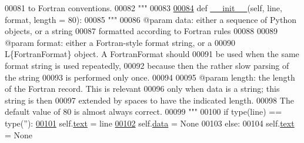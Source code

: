 \begin{DoxyCode}
00081 \textcolor{stringliteral}{         to Fortran conventions.}
00082 \textcolor{stringliteral}{    """}
00083 
\hypertarget{_fortran_format_8py_source_l00084}{}\hyperlink{classpyneb_1_1utils_1_1_fortran_format_1_1_fortran_line_a292ba8e3d93bd751d6d13fdc1671ccb2}{00084}     \textcolor{keyword}{def }\hyperlink{classpyneb_1_1utils_1_1_fortran_format_1_1_fortran_line_a292ba8e3d93bd751d6d13fdc1671ccb2}{\_\_init\_\_}(self, line, format, length = 80):
00085         \textcolor{stringliteral}{"""}
00086 \textcolor{stringliteral}{        @param data: either a sequence of Python objects, or a string}
00087 \textcolor{stringliteral}{                     formatted according to Fortran rules}
00088 \textcolor{stringliteral}{}
00089 \textcolor{stringliteral}{        @param format: either a Fortran-style format string, or a}
00090 \textcolor{stringliteral}{                       L\{FortranFormat\} object. A FortranFormat should}
00091 \textcolor{stringliteral}{                       be used when the same format string is used repeatedly,}
00092 \textcolor{stringliteral}{                       because then the rather slow parsing of the string}
00093 \textcolor{stringliteral}{                       is performed only once.}
00094 \textcolor{stringliteral}{}
00095 \textcolor{stringliteral}{        @param length: the length of the Fortran record. This is relevant}
00096 \textcolor{stringliteral}{                       only when data is a string; this string is then}
00097 \textcolor{stringliteral}{                       extended by spaces to have the indicated length.}
00098 \textcolor{stringliteral}{                       The default value of 80 is almost always correct.}
00099 \textcolor{stringliteral}{        """}
00100         \textcolor{keywordflow}{if} type(line) == type(\textcolor{stringliteral}{''}):
\hypertarget{_fortran_format_8py_source_l00101}{}\hyperlink{classpyneb_1_1utils_1_1_fortran_format_1_1_fortran_line_a70d4893b8dd8ae61297b1d3e4b8bc612}{00101}             self.\hyperlink{classpyneb_1_1utils_1_1_fortran_format_1_1_fortran_line_a70d4893b8dd8ae61297b1d3e4b8bc612}{text} = line
\hypertarget{_fortran_format_8py_source_l00102}{}\hyperlink{classpyneb_1_1utils_1_1_fortran_format_1_1_fortran_line_a5976b8e1d4375a2ea62b9359bcf84697}{00102}             self.\hyperlink{classpyneb_1_1utils_1_1_fortran_format_1_1_fortran_line_a5976b8e1d4375a2ea62b9359bcf84697}{data} = \textcolor{keywordtype}{None}
00103         \textcolor{keywordflow}{else}:
00104             self.\hyperlink{classpyneb_1_1utils_1_1_fortran_format_1_1_fortran_line_a70d4893b8dd8ae61297b1d3e4b8bc612}{text} = \textcolor{keywordtype}{None}

\end{DoxyCode}
